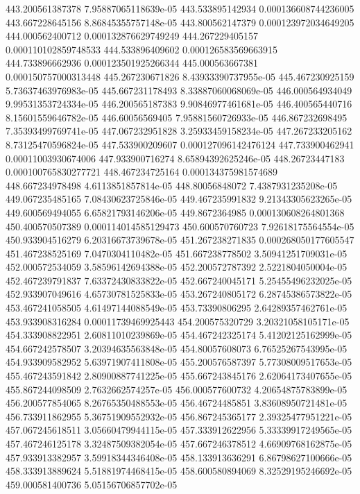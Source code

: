 {443.200561387378 7.95887065118639e-05
443.533895142934 0.000136608744236005
443.667228645156 8.86845355757148e-05
443.800562147379 0.000123972034649205
444.000562400712 0.000132876629749249
444.267229405157 0.000110102859748533
444.533896409602 0.000126583569663915
444.733896662936 0.000123501925266344
445.000563667381 0.000150757000313448
445.267230671826 8.43933390737955e-05
445.467230925159 5.73637463976983e-05
445.667231178493 8.33887060068069e-05
446.000564934049 9.99531353724334e-05
446.200565187383 9.90846977461681e-05
446.400565440716 8.15601559646782e-05
446.60056569405 7.95881560726933e-05
446.867232698495 7.35393499769741e-05
447.067232951828 3.25933459158234e-05
447.267233205162 8.73125470596824e-05
447.533900209607 0.000127096142476124
447.733900462941 0.00011003930674006
447.933900716274 8.65894392625246e-05
448.26723447183 0.000100765830277721
448.467234725164 0.000134375981574689
448.667234978498 4.6113851857814e-05
448.80056848072 7.4387931235208e-05
449.067235485165 7.08430623725846e-05
449.467235991832 9.21343305623265e-05
449.600569494055 6.65821793146206e-05
449.8672364985 0.000130608264801368
450.400570507389 0.000114014585129473
450.600570760723 7.92618175564554e-05
450.933904516279 6.20316673739678e-05
451.267238271835 0.000268050177605547
451.467238525169 7.0470304110482e-05
451.667238778502 3.50941251709031e-05
452.000572534059 3.58596142694388e-05
452.200572787392 2.5221804050004e-05
452.467239791837 7.63372430833822e-05
452.667240045171 5.25455496232025e-05
452.933907049616 4.65730781525833e-05
453.267240805172 6.28745386573822e-05
453.467241058505 4.61497144088549e-05
453.73390806295 2.64289357462761e-05
453.933908316284 0.00011739469925443
454.200575320729 3.20321058105171e-05
454.333908822951 2.60811010239869e-05
454.467242325174 5.41202125162999e-05
454.667242578507 3.20394635563848e-05
454.80057608073 6.76525267543995e-05
454.933909582952 5.63971907411808e-05
455.200576587397 5.77308009517653e-05
455.467243591842 2.80900887741225e-05
455.667243845176 2.62064173407655e-05
455.867244098509 2.7632662574257e-05
456.000577600732 4.20654875783899e-05
456.200577854065 8.26765350488553e-05
456.46724485851 3.83608950721481e-05
456.733911862955 5.36751909552932e-05
456.867245365177 2.39325477951221e-05
457.067245618511 3.05660479944115e-05
457.333912622956 5.33339917249565e-05
457.467246125178 3.32487509382054e-05
457.667246378512 4.66909768162875e-05
457.933913382957 3.59918344346408e-05
458.133913636291 6.86798627100666e-05
458.333913889624 5.51881974468415e-05
458.600580894069 8.32529195246692e-05
459.000581400736 5.05156706857702e-05
}
